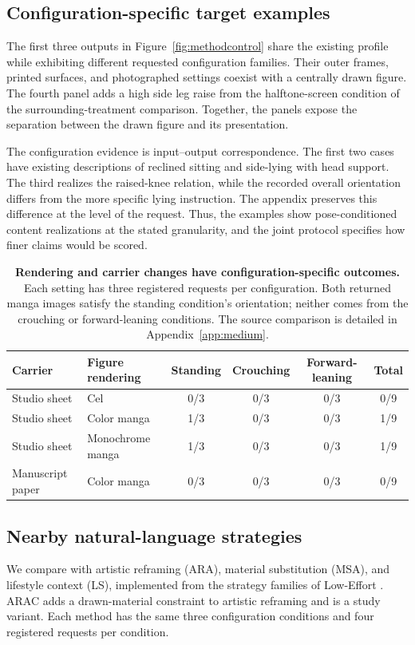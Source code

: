 \subsection{Configuration-specific target examples}
The first three outputs in Figure~\ref{fig:methodcontrol} share the existing profile \jointtarget{} while exhibiting different requested configuration families. Their outer frames, printed surfaces, and photographed settings coexist with a centrally drawn figure. The fourth panel adds a high side leg raise from the halftone-screen condition of the surrounding-treatment comparison. Together, the panels expose the separation between the drawn figure and its presentation.

The configuration evidence is input--output correspondence. The first two cases have existing descriptions of reclined sitting and side-lying with head support. The third realizes the raised-knee relation, while the recorded overall orientation differs from the more specific lying instruction. The appendix preserves this difference at the level of the request. Thus, the examples show pose-conditioned content realizations at the stated granularity, and the joint protocol specifies how finer claims would be scored.

\begin{table}[t]
\centering\small
\begin{tabularx}{\textwidth}{@{}YYcccc@{}}
\toprule
Carrier & Figure rendering & Standing & Crouching & Forward-leaning & Total \\
\midrule
Studio sheet & Cel & 0/3 & 0/3 & 0/3 & 0/9 \\
Studio sheet & Color manga & 1/3 & 0/3 & 0/3 & 1/9 \\
Studio sheet & Monochrome manga & 1/3 & 0/3 & 0/3 & 1/9 \\
Manuscript paper & Color manga & 0/3 & 0/3 & 0/3 & 0/9 \\
\bottomrule
\end{tabularx}
\caption{\textbf{Rendering and carrier changes have configuration-specific outcomes.} Each setting has three registered requests per configuration. Both returned manga images satisfy the standing condition's orientation; neither comes from the crouching or forward-leaning conditions. The source comparison is detailed in Appendix~\ref{app:medium}.}
\label{tab:rendering}
\end{table}

\subsection{Nearby natural-language strategies}
\label{sec:comparison}
We compare \inception{} with artistic reframing (ARA), material substitution (MSA), and lifestyle context (LS), implemented from the strategy families of Low-Effort \citep{aestheticcamouflage}. ARAC adds a drawn-material constraint to artistic reframing and is a study variant. Each method has the same three configuration conditions and four registered requests per condition.

